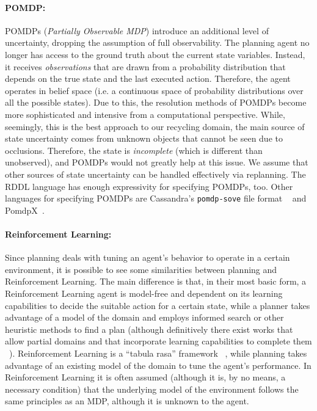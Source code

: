\documentclass[../root.tex]{subfiles}
\begin{document}
\paragraph{POMDP:} POMDPs (\emph{Partially Observable MDP})
introduce an additional level of uncertainty,
dropping the assumption of full observability.
The planning agent no longer has access to the ground truth about the
current state variables. Instead, it receives \emph{observations} that
are drawn from a probability distribution that depends on the true state
and the last executed action. Therefore, the agent operates in belief
space (i.e. a continuous space of probability distributions over all
the possible states). Due to this, the resolution methods
of POMDPs become more sophisticated and intensive from a computational
perspective. While, seemingly, this is the best approach to our
recycling domain, the main source of state uncertainty comes from unknown
objects that cannot be seen due to occlusions. Therefore, the state is
\emph{incomplete} (which is different than unobserved),
and POMDPs would not greatly help at this issue. We assume that other
sources of state
uncertainty can be handled effectively via replanning. The RDDL language
has enough expressivity for specifying POMDPs, too. Other languages
for specifying POMDPs are Cassandra's \texttt{pomdp-sove} file format%
~\cite{cassandra2018pomdp} and PomdpX~\cite{hsu2018pomdpx}.
 
\paragraph{Reinforcement Learning:} Since planning deals
with tuning an agent's
behavior to operate in a certain environment, it is possible to see some
similarities between planning and Reinforcement Learning. The main difference
is that, in their most basic form, a Reinforcement Learning agent is
model-free and dependent on its learning capabilities to decide the
suitable action for a certain state, while a planner takes advantage of a
model of the domain and employs informed search or other heuristic methods to
find a plan (although definitively there
exist works that allow partial domains and that incorporate learning
capabilities to complete them%
~\cite{martinez2017relational,martinez2015vmin}). Reinforcement
Learning is a ``tabula rasa'' framework%
~\cite{sutton2018reinforcement}, while planning takes advantage
of an existing model of the domain to tune the agent's performance.
In Reinforcement Learning it is often assumed (although it is, by no means,
a necessary condition) that the underlying model of the environment follows
the same principles as an MDP, although it is unknown to the agent.
\end{document}
